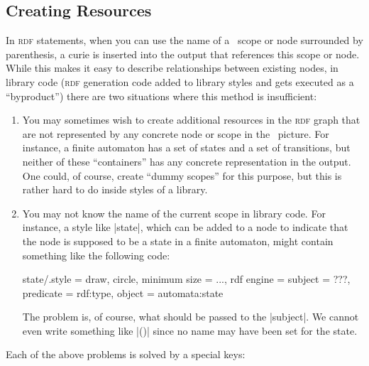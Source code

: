 \subsection{Creating Resources}

In \textsc{rdf} statements, when you can use the name of a \tikzname\ scope or
node surrounded by parenthesis, a curie is inserted into the output that
references this scope or node. While this makes it easy to describe
relationships between existing nodes, in library code (\textsc{rdf} generation
code added to library styles and gets executed as a ``byproduct'') there are
two situations where this method is insufficient:
%
\begin{enumerate}
    \item You may sometimes wish to create additional resources in the
        \textsc{rdf} graph that are not represented by any concrete node or
        scope in the \tikzname\ picture. For instance, a finite automaton has a
        set of states and a set of transitions, but neither of these
        ``containers'' has any concrete representation in the output. One
        could, of course, create ``dummy scopes'' for this purpose, but this is
        rather hard to do inside styles of a library.
    \item You may not know the name of the current scope in library code. For
        instance, a style like |state|, which can be added to a node to
        indicate that the node is supposed to be a state in a finite automaton,
        might contain something like the following code:
\begin{codeexample}
state/.style = {
  draw, circle, minimum size = ...,
  rdf engine = {
    subject   = ???,
    predicate = rdf:type,
    object    = automata:state
  }
}
\end{codeexample}
        The problem is, of course, what should be passed to the |subject|. We
        cannot even write something like |(\tikz@fig@name)| since no name may
        have been set for the state.
\end{enumerate}

Each of the above problems is solved by a special keys:


